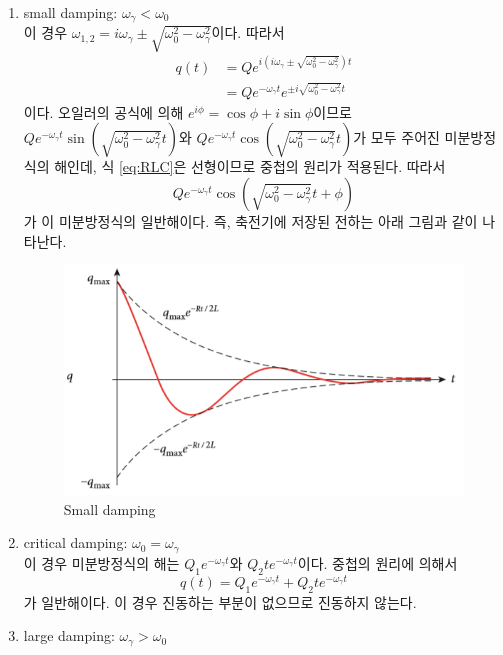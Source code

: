 \begin{enumerate}
\item small damping: $\omega_\gamma<\omega_0$\\
이 경우 $\omega_{1,2}=i\omega_\gamma\pm \sqrt{\omega_0^2-\omega_\gamma^2}$이다. 따라서
\begin{align}
q(t)&=Qe^{i(i\omega_\gamma\pm \sqrt{\omega_0^2-\omega_\gamma^2})t}\\
			&= Qe^{-\omega_\gamma t}e^{\pm i\sqrt{\omega_0^2-\omega_\gamma^2}t}
\end{align}이다. 오일러의 공식에 의해 $e^{i\phi}=\cos{\phi}+i\sin{\phi}$이므로
	$Qe^{-\omega_\gamma t}\sin(\sqrt{\omega_0^2-\omega_\gamma^2}t)$와 $Qe^{-\omega_\gamma t}\cos(\sqrt{\omega_0^2-\omega_\gamma^2}t)$가 모두 주어진 미분방정식의 해인데, 식 \ref{eq:RLC}은 선형이므로 중첩의 원리가 적용된다. 따라서 
	\begin{equation}
	    Qe^{-\omega_\gamma t}\cos(\sqrt{\omega_0^2-\omega_\gamma^2}t+\phi)
	\end{equation}
가 이 미분방정식의 	일반해이다. 즉, 축전기에 저장된 전하는 아래 그림과 같이 나타난다.
\begin{figure}[h]
\centering\includegraphics[scale=0.5]{Pictures/small_damping.PNG}
\caption{Small damping}
\label{fig:small_damping}
\end{figure}
\item critical damping: $\omega_0=\omega_\gamma$\\
이 경우 미분방정식의 해는 $Q_1e^{-\omega_\gamma t}$와 $ Q_2te^{-\omega_\gamma t}$이다. 중첩의 원리에 의해서
\begin{equation}
    q(t) = Q_1e^{-\omega_\gamma t}+Q_2te^{-\omega_\gamma t}
\end{equation}
가 일반해이다. 이 경우 진동하는 부분이 없으므로 진동하지 않는다.
\item large damping: $\omega_\gamma>\omega_0$\\

\end{enumerate}
